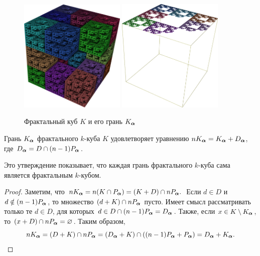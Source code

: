 \begin{figure}[h!]
\centering
\includegraphics[width=0.45\textwidth]{images/presentation/qK.png}
 \hfill
 \includegraphics[width=0.45\textwidth]{images/presentation/qK_a.png}
  \caption{Фрактальный куб $K$ и его грань $K_{\bm{\alpha}}$}
 \label{fig:qK_a}
\end{figure}

\begin{proposition}\label{prop:Ka}
Грань $K_{\bm{\alpha}}$ фрактального $k$-куба $K$ удовлетворяет уравнению $n K_{\bm{\alpha}}=K_{\bm{\alpha}}+D_{\bm{\alpha}}$, где $D_{\bm{\alpha}}=D\cap(n-1)P_{\bm{\alpha}}$.
\end{proposition}

Это утверждение показывает, что каждая грань фрактального $k$-куба сама является фрактальным $k$-кубом.

\begin{proof}
Заметим, что $n K_{\bm{\alpha}}=n(K\cap P_{\bm{\alpha}})=(K+D)\cap nP_{\bm{\alpha}}.$ 
Если $d\in D$ и   $d\notin(n-1)P_{\bm{\alpha}}$, то множество $(d+K)\cap nP_{\bm{\alpha}}$ пусто.
Имеет смысл рассматривать только те $d\in D$, для которых $d\in D\cap (n-1)P_{\bm{\alpha}}=D_{\bm{\alpha}}$. Также, если $x\in K\setminus K_{\bm{\alpha}}$, то $(x+D)\cap nP_{\bm{\alpha}}=\varnothing$.  
Таким образом, $$n K_{\bm{\alpha}}=(D+K)\cap n P_{\bm{\alpha}}=(D_{\bm{\alpha}}+K)\cap ((n-1)P_{\bm{\alpha}}+P_{\bm{\alpha}})=D_{\bm{\alpha}}+K_{\bm{\alpha}}.$$
\end{proof}


